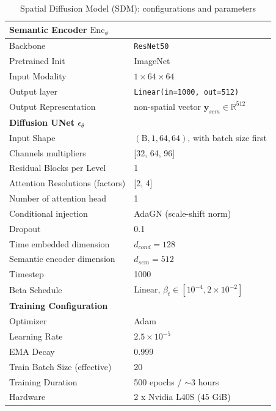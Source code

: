 \begin{table}[h]
\captionsetup{justification=raggedright,singlelinecheck=false}
\caption{Spatial Diffusion Model (SDM): configurations and parameters}

\begin{adjustbox}{max width=0.9\textwidth}
    \begin{tabular}{ll}
    \toprule
    \multicolumn{2}{l}{\textbf{Semantic Encoder $\mathrm{Enc}_{\phi}$}} \\
    \midrule
    Backbone & \texttt{ResNet50}\cite{ResNet50} \\
    Pretrained Init & ImageNet \\
    Input Modality & $1 \times 64 \times 64 $ \\
    Output layer & \texttt{Linear(in=1000, out=512)} \\
    Output Representation & non-spatial vector $\mathbf{y}_{sem} \in \mathbb{R}^{512}$ \\
    \midrule
    \multicolumn{2}{l}{\textbf{Diffusion UNet $\epsilon_{\theta}$}} \\
    \midrule
    Input Shape & $(\text{B}, 1, 64, 64)$, with batch size first \\
    Channels multipliers & [32, 64, 96] \\
    Residual Blocks per Level & 1 \\
    Attention Resolutions (factors) & [2, 4] \\
    Number of attention head & 1 \\
    Conditional injection & AdaGN (scale-shift norm) \\
    Dropout & 0.1 \\
    Time embedded dimension & $d_{cond} = 128$ \\
    Semantic encoder dimension & $d_{sem}=512$ \\
    Timestep & 1000 \\
    Beta Schedule & Linear, $\beta_t \in [10^{-4}, 2 \times 10^{-2}]$ \\
    \midrule
    \multicolumn{2}{l}{\textbf{Training Configuration}} \\
    \midrule
    Optimizer & Adam \\
    Learning Rate & $2.5 \times 10^{-5}$ \\
    EMA Decay & 0.999 \\
    Train Batch Size (effective) & 20 \\
    Training Duration & 500 epochs / $\sim$3 hours \\
    Hardware & 2 x Nvidia L40S (45 GiB) \\
    \bottomrule
    \end{tabular}
\end{adjustbox}
\label{tab:sdm-config}
\end{table}

